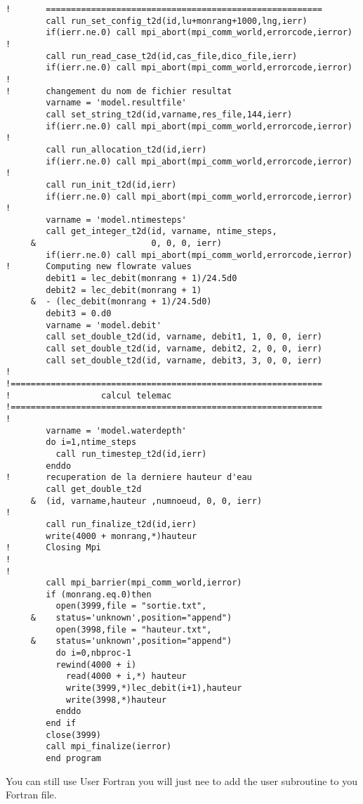 \begin{lstlisting}
!       =======================================================
        call run_set_config_t2d(id,lu+monrang+1000,lng,ierr)
        if(ierr.ne.0) call mpi_abort(mpi_comm_world,errorcode,ierror)
!
        call run_read_case_t2d(id,cas_file,dico_file,ierr)
        if(ierr.ne.0) call mpi_abort(mpi_comm_world,errorcode,ierror)
!
!       changement du nom de fichier resultat
        varname = 'model.resultfile'
        call set_string_t2d(id,varname,res_file,144,ierr)
        if(ierr.ne.0) call mpi_abort(mpi_comm_world,errorcode,ierror)
!       
        call run_allocation_t2d(id,ierr)
        if(ierr.ne.0) call mpi_abort(mpi_comm_world,errorcode,ierror)
!
        call run_init_t2d(id,ierr)
        if(ierr.ne.0) call mpi_abort(mpi_comm_world,errorcode,ierror)
!
        varname = 'model.ntimesteps'
        call get_integer_t2d(id, varname, ntime_steps, 
     &                       0, 0, 0, ierr)
        if(ierr.ne.0) call mpi_abort(mpi_comm_world,errorcode,ierror)
!       Computing new flowrate values
        debit1 = lec_debit(monrang + 1)/24.5d0
        debit2 = lec_debit(monrang + 1) 
     &  - (lec_debit(monrang + 1)/24.5d0)
        debit3 = 0.d0
        varname = 'model.debit'
        call set_double_t2d(id, varname, debit1, 1, 0, 0, ierr)
        call set_double_t2d(id, varname, debit2, 2, 0, 0, ierr)
        call set_double_t2d(id, varname, debit3, 3, 0, 0, ierr)
!
!==============================================================
!                  calcul telemac
!==============================================================
!
        varname = 'model.waterdepth'
        do i=1,ntime_steps
          call run_timestep_t2d(id,ierr)
        enddo 
!       recuperation de la derniere hauteur d'eau
        call get_double_t2d
     &  (id, varname,hauteur ,numnoeud, 0, 0, ierr)
!
        call run_finalize_t2d(id,ierr)
        write(4000 + monrang,*)hauteur
!       Closing Mpi
!
!
        call mpi_barrier(mpi_comm_world,ierror)
        if (monrang.eq.0)then
          open(3999,file = "sortie.txt",
     &    status='unknown',position="append")
          open(3998,file = "hauteur.txt",
     &    status='unknown',position="append")
          do i=0,nbproc-1
          rewind(4000 + i)
            read(4000 + i,*) hauteur
            write(3999,*)lec_debit(i+1),hauteur
            write(3998,*)hauteur
          enddo
        end if
        close(3999)
        call mpi_finalize(ierror)
        end program
\end{lstlisting}

You can still use User Fortran you will just nee to add the user subroutine to
you Fortran file.

